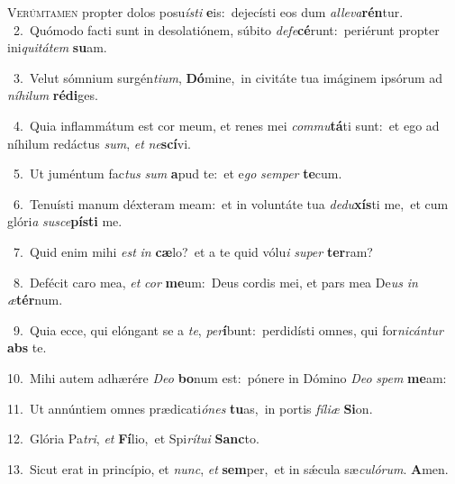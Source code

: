 \lettrine{\initial\textcolor{\initialcolor}{V}}{erúmtamen} propter dolos posu\-\textit{ís}\-\textit{ti} \textbf{e}\-is:~\star dejecísti eos dum \textit{al}\-\textit{le}\textit{va}\textbf{rén}tur.\\
{\numbfont\textcolor{\numbcolor}{~2.}}~Quómodo facti sunt in desolatiónem, súbito \textit{de}\-\textit{fe}\textbf{cé}runt:~\star periérunt propter ini\-\textit{qui}\-\textit{tá}\textit{tem} \textbf{su}\-am.\par
{\numbfont\textcolor{\numbcolor}{~3.}}~Velut sómnium surgén\-\textit{ti}\-\textit{um}, \textbf{Dó}\-mine,~\star in civitáte tua imáginem ipsórum ad \textit{ní}\-\textit{hi}\textit{lum} \textbf{réd}\-\textbf{i}ges.\par
{\numbfont\textcolor{\numbcolor}{~4.}}~Quia inflammátum est cor meum, et renes mei \textit{com}\-\textit{mu}\textbf{tá}ti sunt:~\star et ego ad níhilum redáctus \textit{sum}\-, \textit{et} \textit{ne}\-\textbf{scí}vi.\par
{\numbfont\textcolor{\numbcolor}{~5.}}~Ut juméntum fac\textit{tus} \textit{sum} \textbf{a}\-pud te:~\star et e\textit{go} \textit{sem}\-\textit{per} \textbf{te}\-cum.\par
{\numbfont\textcolor{\numbcolor}{~6.}}~Tenuísti manum déxteram meam:~\dagger et in voluntáte tua \textit{de}\-\textit{du}\textbf{xís}ti me,~\star et cum glóri\textit{a} \textit{su}\-\textit{sce}\textbf{pís}\textbf{ti} me.\par
{\numbfont\textcolor{\numbcolor}{~7.}}~Quid enim mihi \textit{est} \textit{in} \textbf{cæ}\-lo?~\star et a te quid vólu\textit{i} \textit{su}\-\textit{per} \textbf{ter}\-ram?\par
{\numbfont\textcolor{\numbcolor}{~8.}}~Defécit caro mea, \textit{et} \textit{cor} \textbf{me}\-um:~\star Deus cordis mei, et pars mea De\textit{us} \textit{in} \textit{æ}\-\textbf{tér}num.\par
{\numbfont\textcolor{\numbcolor}{~9.}}~Quia ecce, qui elóngant se a \textit{te}\-, \textit{per}\-\textbf{í}bunt:~\star perdidísti omnes, qui for\-\textit{ni}\-\textit{cán}\textit{tur} \textbf{abs} te.\par
{\numbfont\textcolor{\numbcolor}{10.}}~Mihi autem adhærére \textit{De}\-\textit{o} \textbf{bo}\-num est:~\star pónere in Dómino \textit{De}\-\textit{o} \textit{spem} \textbf{me}\-am:\par
{\numbfont\textcolor{\numbcolor}{11.}}~Ut annúntiem omnes prædicati\-\textit{ó}\-\textit{nes} \textbf{tu}\-as,~\star in portis \textit{fí}\-\textit{li}\textit{æ} \textbf{Si}\-on.\par
{\numbfont\textcolor{\numbcolor}{12.}}~Glória Pa\-\textit{tri}\-, \textit{et} \textbf{Fí}\-lio,~\star et Spi\-\textit{rí}\-\textit{tu}\textit{i} \textbf{Sanc}\-to.\par
{\numbfont\textcolor{\numbcolor}{13.}}~Sicut erat in princípio, et \textit{nunc}\-, \textit{et} \textbf{sem}\-per,~\star et in sǽcula sæ\-\textit{cu}\-\textit{ló}\textit{rum}. \textbf{A}\-men.\par
